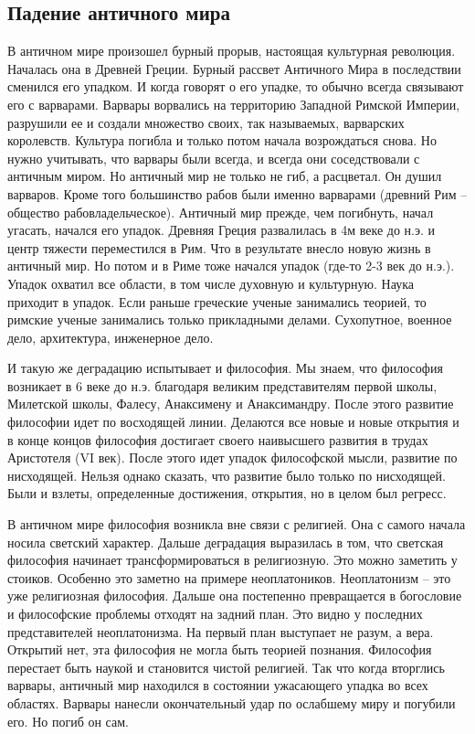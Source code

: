 \subsection{Падение античного мира}

В античном мире произошел бурный прорыв, настоящая культурная революция. Началась она в Древней Греции. Бурный рассвет Античного Мира в последствии сменился его упадком. И когда говорят о его упадке, то обычно всегда связывают его с варварами. Варвары ворвались на территорию Западной Римской Империи, разрушили ее и создали множество своих, так называемых, варварских королевств. Культура погибла и только потом начала возрождаться снова. Но нужно учитывать, что варвары были всегда, и всегда они соседствовали с античным миром. Но античный мир не только не гиб, а расцветал. Он душил варваров. Кроме того большинство рабов были именно варварами (древний Рим – общество рабовладельческое). Античный мир прежде, чем погибнуть, начал угасать, начался его упадок. Древняя Греция развалилась в 4м веке до н.э. и центр тяжести переместился в Рим. Что в результате внесло новую жизнь в античный мир. Но потом и в Риме тоже начался упадок (где-то 2-3 век до н.э.). Упадок охватил все области, в том числе духовную и культурную. Наука приходит в упадок. Если раньше греческие ученые занимались теорией, то римские ученые занимались только прикладными делами. Сухопутное, военное дело, архитектура, инженерное дело.

И такую же деградацию испытывает и философия. Мы знаем, что философия возникает в 6 веке до н.э. благодаря великим представителям первой школы, Милетской школы, Фалесу, Анаксимену и Анаксимандру. После этого развитие философии идет по восходящей линии. Делаются все новые и новые открытия и в конце концов философия достигает своего наивысшего развития в трудах Аристотеля (VI век). После этого идет упадок философской мысли, развитие по нисходящей. Нельзя однако сказать, что развитие было только по нисходящей. Были и взлеты, определенные достижения, открытия, но в целом был регресс.

В античном мире философия возникла вне связи с религией. Она с самого начала носила светский характер. Дальше деградация выразилась в том, что светская философия начинает трансформироваться в религиозную. Это можно заметить у стоиков. Особенно это заметно на примере неоплатоников. Неоплатонизм – это уже религиозная философия. Дальше она постепенно превращается в богословие и философские проблемы отходят на задний план. Это видно у последних представителей неоплатонизма. На первый план выступает не разум, а вера. Открытий нет, эта философия не могла быть теорией познания. Философия перестает быть наукой и становится чистой религией. Так что когда вторглись варвары, античный мир находился в состоянии ужасающего упадка во всех областях. Варвары нанесли окончательный удар по ослабшему миру и погубили его. Но погиб он сам.

